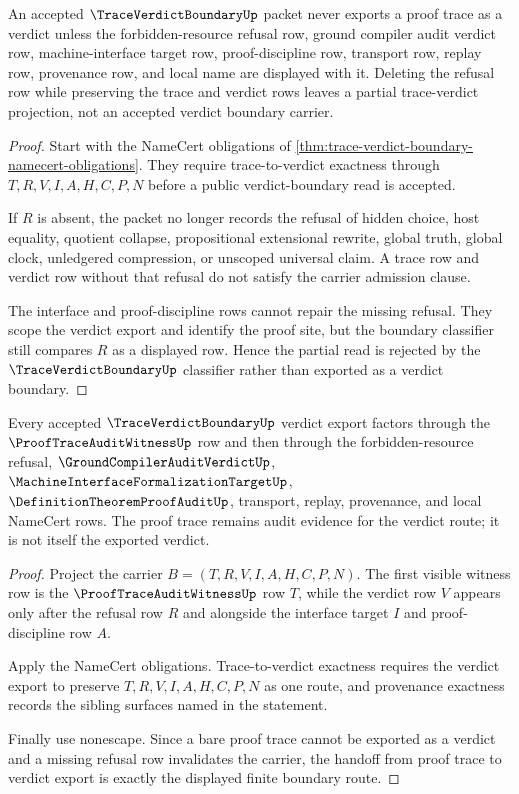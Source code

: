 \begin{theorem}
\label{thm:trace-verdict-boundary-nonescape}
An accepted $\TraceVerdictBoundaryUp$ packet never exports a proof trace as a verdict unless the forbidden-resource refusal row, ground compiler audit verdict row, machine-interface target row, proof-discipline row, transport row, replay row, provenance row, and local name are displayed with it. Deleting the refusal row while preserving the trace and verdict rows leaves a partial trace-verdict projection, not an accepted verdict boundary carrier.
\end{theorem}
\begin{proof}
Start with the NameCert obligations of \autoref{thm:trace-verdict-boundary-namecert-obligations}. They require trace-to-verdict exactness through $T,R,V,I,A,H,C,P,N$ before a public verdict-boundary read is accepted.

If $R$ is absent, the packet no longer records the refusal of hidden choice, host equality, quotient collapse, propositional extensional rewrite, global truth, global clock, unledgered compression, or unscoped universal claim. A trace row and verdict row without that refusal do not satisfy the carrier admission clause.

The interface and proof-discipline rows cannot repair the missing refusal. They scope the verdict export and identify the proof site, but the boundary classifier still compares $R$ as a displayed row. Hence the partial read is rejected by the $\TraceVerdictBoundaryUp$ classifier rather than exported as a verdict boundary.
\end{proof}

\begin{theorem}
\label{thm:trace-verdict-boundary-prooftraceauditwitness-handoff}
Every accepted $\TraceVerdictBoundaryUp$ verdict export factors through the $\ProofTraceAuditWitnessUp$ row and then through the forbidden-resource refusal, $\GroundCompilerAuditVerdictUp$, $\MachineInterfaceFormalizationTargetUp$, $\DefinitionTheoremProofAuditUp$, transport, replay, provenance, and local NameCert rows. The proof trace remains audit evidence for the verdict route; it is not itself the exported verdict.
\end{theorem}
\begin{proof}
Project the carrier $B=(T,R,V,I,A,H,C,P,N)$. The first visible witness row is the $\ProofTraceAuditWitnessUp$ row $T$, while the verdict row $V$ appears only after the refusal row $R$ and alongside the interface target $I$ and proof-discipline row $A$.

Apply the NameCert obligations. Trace-to-verdict exactness requires the verdict export to preserve $T,R,V,I,A,H,C,P,N$ as one route, and provenance exactness records the sibling surfaces named in the statement.

Finally use nonescape. Since a bare proof trace cannot be exported as a verdict and a missing refusal row invalidates the carrier, the handoff from proof trace to verdict export is exactly the displayed finite boundary route.
\end{proof}

